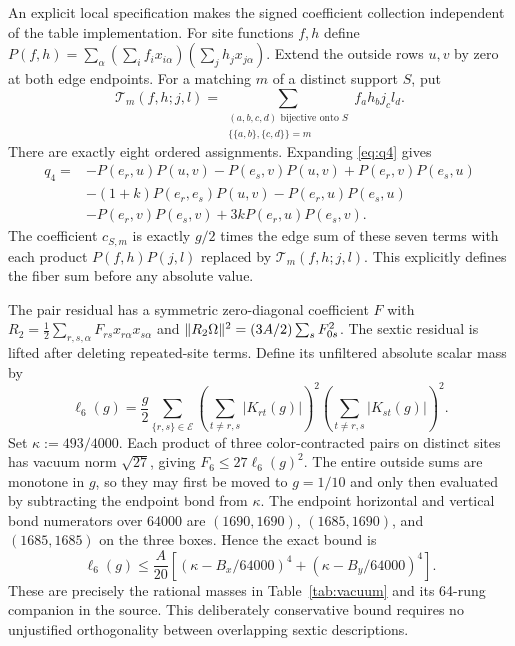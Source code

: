 An explicit local specification makes the signed coefficient collection
independent of the table implementation. For site functions $f,h$ define
$P(f,h)=\sum_\alpha(\sum_i f_ix_{i\alpha})(\sum_j h_jx_{j\alpha})$.
Extend the outside rows $u,v$ by zero at both edge endpoints. For a matching
$m$ of a distinct support $S$, put
\[
 \mathcal T_m(f,h;j,l)=
 \sum_{\substack{(a,b,c,d)\text{ bijective onto }S\\
                 \{\{a,b\},\{c,d\}\}=m}}f_a h_b j_c l_d.
\]
There are exactly eight ordered assignments. Expanding \eqref{eq:q4} gives
\begin{align*}
 q_4={}&-P(e_r,u)P(u,v)-P(e_s,v)P(u,v)+P(e_r,v)P(e_s,u)\\
 &-(1+k)P(e_r,e_s)P(u,v)-P(e_r,u)P(e_s,u)\\
 &-P(e_r,v)P(e_s,v)+3kP(e_r,u)P(e_s,v).
\end{align*}
The coefficient $c_{S,m}$ is exactly $g/2$ times the edge sum of these seven
terms with each product $P(f,h)P(j,l)$ replaced by $\mathcal T_m(f,h;j,l)$.
This explicitly defines the fiber sum before any absolute value.

The pair residual has a symmetric zero-diagonal coefficient $F$ with
$R_2=\frac12\sum_{r,s,\alpha}F_{rs}x_{r\alpha}x_{s\alpha}$ and
$\lVert R_2\Omega\rVert^2=(3A/2)\sum_sF_{0s}^2$.
The sextic residual is lifted after deleting repeated-site terms. Define its
unfiltered absolute scalar mass by
\[
 \ell_6(g)=\frac g2\sum_{\{r,s\}\in\mathcal E}
 \left(\sum_{t\ne r,s}|K_{rt}(g)|\right)^2
 \left(\sum_{t\ne r,s}|K_{st}(g)|\right)^2.
\]
Set $\kappa:=493/4000$. Each product of three color-contracted pairs on distinct sites has vacuum norm
$\sqrt{27}$, giving $F_6\le27\ell_6(g)^2$. The entire outside sums are
monotone in $g$, so they may first be moved to $g=1/10$ and only then evaluated
by subtracting the endpoint bond from $\kappa$. The endpoint horizontal and
vertical bond numerators over $64000$ are $(1690,1690)$, $(1685,1690)$, and
$(1685,1685)$ on the three boxes. Hence the exact bound is
\[
 \ell_6(g)\le\frac A{20}
 \left[(\kappa-B_x/64000)^4+(\kappa-B_y/64000)^4\right].
\]
These are precisely the rational masses in Table~\ref{tab:vacuum} and its
64-rung companion in the source. This deliberately conservative bound requires no unjustified
orthogonality between overlapping sextic descriptions.

